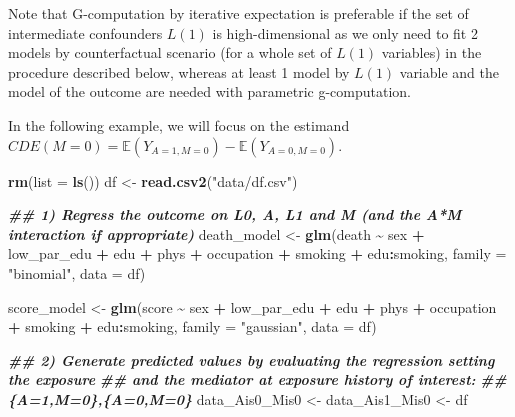 \documentclass[
]{book}
\newenvironment{Shaded}{\begin{snugshade}}{\end{snugshade}}
\newcommand{\AttributeTok}[1]{\textcolor[rgb]{0.13,0.29,0.53}{#1}}
\newcommand{\DocumentationTok}[1]{\textcolor[rgb]{0.56,0.35,0.01}{\textbf{\textit{#1}}}}
\newcommand{\FunctionTok}[1]{\textcolor[rgb]{0.13,0.29,0.53}{\textbf{#1}}}
\newcommand{\NormalTok}[1]{#1}
\newcommand{\OtherTok}[1]{\textcolor[rgb]{0.56,0.35,0.01}{#1}}
\newcommand{\SpecialCharTok}[1]{\textcolor[rgb]{0.81,0.36,0.00}{\textbf{#1}}}
\newcommand{\StringTok}[1]{\textcolor[rgb]{0.31,0.60,0.02}{#1}}
\begin{document}
Note that G-computation by iterative expectation is preferable if the set of intermediate confounders \(L(1)\) is high-dimensional as we only need to fit 2 models by counterfactual scenario (for a whole set of \(L(1)\) variables) in the procedure described below, whereas at least 1 model by \(L(1)\) variable and the model of the outcome are needed with parametric g-computation.

In the following example, we will focus on the estimand \(CDE(M=0) = \mathbb{E}(Y_{A=1,M=0}) - \mathbb{E}(Y_{A=0,M=0})\).

\begin{Shaded}
\begin{Highlighting}[]
\FunctionTok{rm}\NormalTok{(}\AttributeTok{list =} \FunctionTok{ls}\NormalTok{())}
\NormalTok{df }\OtherTok{\textless{}{-}} \FunctionTok{read.csv2}\NormalTok{(}\StringTok{"data/df.csv"}\NormalTok{)}

\DocumentationTok{\#\# 1) Regress the outcome on L0, A, L1 and M (and the A*M interaction if appropriate)}
\NormalTok{death\_model }\OtherTok{\textless{}{-}} \FunctionTok{glm}\NormalTok{(death }\SpecialCharTok{\textasciitilde{}}\NormalTok{ sex }\SpecialCharTok{+}\NormalTok{ low\_par\_edu }\SpecialCharTok{+}\NormalTok{ edu }\SpecialCharTok{+}\NormalTok{ phys }\SpecialCharTok{+}\NormalTok{ occupation }\SpecialCharTok{+}
\NormalTok{                     smoking }\SpecialCharTok{+}\NormalTok{ edu}\SpecialCharTok{:}\NormalTok{smoking,}
                   \AttributeTok{family =} \StringTok{"binomial"}\NormalTok{, }\AttributeTok{data =}\NormalTok{ df)}
                       
\NormalTok{score\_model }\OtherTok{\textless{}{-}} \FunctionTok{glm}\NormalTok{(score }\SpecialCharTok{\textasciitilde{}}\NormalTok{ sex }\SpecialCharTok{+}\NormalTok{ low\_par\_edu }\SpecialCharTok{+}\NormalTok{ edu }\SpecialCharTok{+}\NormalTok{ phys }\SpecialCharTok{+}\NormalTok{ occupation }\SpecialCharTok{+}
\NormalTok{                     smoking }\SpecialCharTok{+}\NormalTok{ edu}\SpecialCharTok{:}\NormalTok{smoking,}
                   \AttributeTok{family =} \StringTok{"gaussian"}\NormalTok{, }\AttributeTok{data =}\NormalTok{ df)}

\DocumentationTok{\#\# 2) Generate predicted values by evaluating the regression setting the exposure}
\DocumentationTok{\#\#    and the mediator at exposure history of interest:}
\DocumentationTok{\#\#    \{A=1,M=0\},\{A=0,M=0\}}
\NormalTok{data\_Ais0\_Mis0 }\OtherTok{\textless{}{-}}\NormalTok{ data\_Ais1\_Mis0 }\OtherTok{\textless{}{-}}\NormalTok{ df}


\end{Highlighting}
\end{Shaded}
\end{document}
